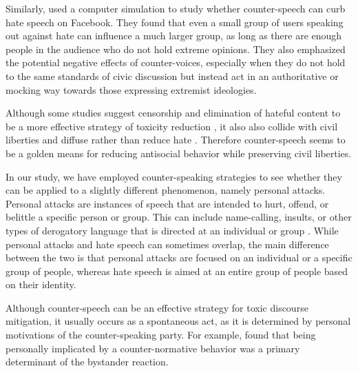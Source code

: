 \documentclass[preprint,12pt]{elsarticle}
\begin{document}
Similarly, \citep{schieb2016governing} used a computer simulation to study whether counter-speech can curb hate speech on Facebook. They found that even a small group of users speaking out against hate can influence a much larger group, as long as there are enough people in the audience who do not hold extreme opinions. They also emphasized the potential negative effects of counter-voices, especially when they do not hold to the same standards of civic discussion but instead act in an authoritative or mocking way towards those expressing extremist ideologies. 

Although some studies suggest censorship and elimination of hateful content to be a more effective strategy of toxicity reduction \citep{alvarez2018normative}, it also also collide with civil liberties and diffuse rather than reduce hate \citep{chandrasekharan2017you}. Therefore counter-speech seems to be a golden means for reducing antisocial behavior while preserving civil liberties. 


In our study, we have employed counter-speaking strategies to see whether they can be applied to a slightly different phenomenon, namely personal attacks. Personal attacks are instances of speech that are intended to hurt, offend, or belittle a specific person or group. This can include name-calling, insults, or other types of derogatory language that is directed at an individual or group \citep{bilewicz2021artificial}. While personal attacks and hate speech can sometimes overlap, the main difference between the two is that personal attacks are focused on an individual or a specific group of people, whereas hate speech is aimed at an entire group of people based on their identity.



Although counter-speech can be an effective strategy for toxic discourse mitigation, it usually occurs as a spontaneous act, as it is determined by personal motivations of the counter-speaking party. For example, \citet{brauer2010descriptive} found that being personally implicated by a counter-normative behavior was a primary determinant of the bystander reaction. 
\end{document}

